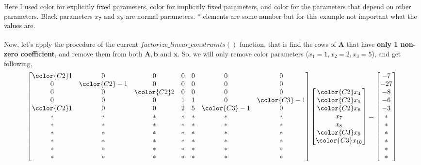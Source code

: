 Here I used {\color{C1}color} for explicitly fixed parameters, {\color{C2}color} for implicitly fixed parameters, and {\color{C3}color} for the parameters that depend on other parameters. Black parameters $x_7$ and $x_8$ are normal parameters. $*$ elements are some number but for this example not important what the values are. \\\\
Now, let's apply the procedure of the current $factorize\_linear\_constraints()$ function, that is find the rows of $\mathbf{A}$ that have \textbf{only 1 non-zero coefficient}, and remove them from both $\mathbf{A}, \mathbf{b}$ and $\mathbf{x}$. So, we will only remove {\color{C1}color} parameters {\color{C1}($x_1 = 1, x_2 = 2, x_3 = 5$)}, and get following,
\begin{equation*}
    \begin{bmatrix}
         \color{C2} 1 &  0 &  0 &  0 &  0 & 0 &  0 \\
         0 &  \color{C2} -1 &  0 &  0 &  0 & 0 &  0 \\
         0 &  0 &  \color{C2} 2 &  0 &  0 & 0 &  0 \\
         0 &  0 &  0 &  1 &  1 & 0 & \color{C3}-1 \\
         \color{C2}1 &  0 &  0 &  2 &  5 & \color{C3}-1 &  0 \\
         * &  * &  * &  * &  * & * &  *\\
         * &  * &  * &  * &  * & * &  *\\
         * &  * &  * &  * &  * & * &  *\\
         * &  * &  * &  * &  * & * &  *\\
         * &  * &  * &  * &  * & * &  *\\
         * &  * &  * &  * &  * & * &  *\\
    \end{bmatrix}
    \begin{bmatrix}
        \color{C2} x_4 \\ 
        \color{C2} x_5 \\ 
        \color{C2} x_6 \\ 
        x_7 \\ 
        x_8 \\ 
        \color{C3} x_9 \\ 
        \color{C3} x_{10} 
    \end{bmatrix}
    =
    \begin{bmatrix}
        -7 \\ -27 \\ -8 \\ -6 \\ -3 \\ * \\ * \\ * \\ * \\ * \\ * 
    \end{bmatrix}
\end{equation*}
